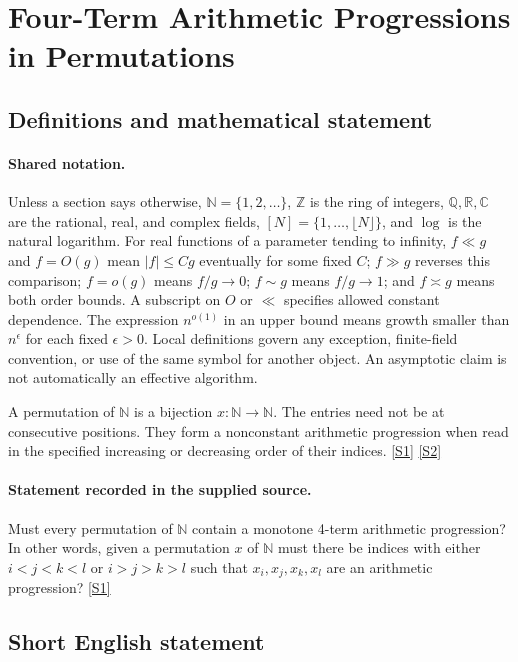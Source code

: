 \documentclass[11pt,a4paper]{article}
\newcommand{\N}{\mathbb{N}}
\newcommand{\Z}{\mathbb{Z}}
\newcommand{\Q}{\mathbb{Q}}
\newcommand{\R}{\mathbb{R}}
\newcommand{\C}{\mathbb{C}}
\newcommand{\sref}[2]{\hyperlink{source:#1:#2}{[S#2]}}
\begin{document}
\section{Four-Term Arithmetic Progressions in Permutations}\label{statement}


\subsection{Definitions and mathematical statement}

\paragraph{Shared notation.}Unless a section says otherwise, $\N=\{1,2,\ldots\}$,
$\Z$ is the ring of integers, $\Q,\R,\C$ are the rational, real, and complex
fields, $[N]=\{1,\ldots,\lfloor N\rfloor\}$, and $\log$ is the natural
logarithm. For real functions of a parameter tending to infinity,
$f\ll g$ and $f=O(g)$ mean $|f|\leq Cg$ eventually for some fixed $C$;
$f\gg g$ reverses this comparison; $f=o(g)$ means $f/g\to0$;
$f\sim g$ means $f/g\to1$; and $f\asymp g$ means both order bounds.
A subscript on $O$ or $\ll$ specifies allowed constant dependence.
The expression $n^{o(1)}$ in an upper bound means growth smaller than
$n^\epsilon$ for each fixed $\epsilon>0$. Local definitions govern any
exception, finite-field convention, or use of the same symbol for another
object. An asymptotic claim is not automatically an effective algorithm.



A permutation of $\N$ is a bijection $x:\N\to\N$. The entries need not be at consecutive positions. They form a nonconstant arithmetic progression when read in the specified increasing or decreasing order of their indices. \sref{statement}{1} \sref{statement}{2}

\paragraph{Statement recorded in the supplied source.}
Must every permutation of $\mathbb{N}$ contain a monotone 4-term arithmetic progression? In other words, given a permutation $x$ of $\mathbb{N}$ must there be indices with either $i<j<k<l$ or $i>j>k>l$ such that $x_i,x_j,x_k,x_l$ are an arithmetic progression? \sref{statement}{1}

\subsection{Short English statement}
\end{document}
